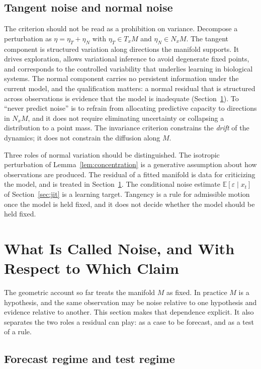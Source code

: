 \documentclass[11pt,a4paper]{article}
\theoremstyle{definition}
\theoremstyle{remark}
\newcommand{\TM}[1]{T_{#1}M}
\newcommand{\NM}[1]{N_{#1}M}
\begin{document}
\subsection{Tangent noise and normal noise}

The criterion should not be read as a prohibition on variance. Decompose a
perturbation as $\eta=\eta_T+\eta_N$ with $\eta_T\in\TM{x}$ and
$\eta_N\in\NM{x}$. The tangent component is structured variation along
directions the manifold supports. It drives exploration, allows
variational inference to avoid degenerate fixed points, and corresponds to
the controlled variability that underlies learning in biological systems.
The normal component carries no persistent information under the current model, and the qualification matters: a normal residual that is structured across observations is evidence that the model is inadequate (Section~\ref{sec:claim}). To
``never predict noise'' is to refrain from allocating predictive capacity
to directions in $\NM{x}$, and it does not require eliminating uncertainty
or collapsing a distribution to a point mass. The invariance criterion constrains the \emph{drift} of the dynamics; it does not constrain the diffusion along $M$.

Three roles of normal variation should be distinguished. The isotropic perturbation of Lemma~\ref{lem:concentration} is a generative assumption about how observations are produced. The residual of a fitted manifold is data for criticizing the model, and is treated in Section~\ref{sec:claim}. The conditional noise estimate $\mathbb{E}[\varepsilon\mid x_t]$ of Section~\ref{sec:jit} is a learning target. Tangency is a rule for admissible motion once the model is held fixed, and it does not decide whether the model should be held fixed.

\section{What Is Called Noise, and With Respect to Which Claim}\label{sec:claim}

The geometric account so far treats the manifold $M$ as fixed. In
practice $M$ is a hypothesis, and the same observation may be noise
relative to one hypothesis and evidence relative to another. This section
makes that dependence explicit. It also separates the two roles a
residual can play: as a case to be forecast, and as a test of a rule.

\subsection{Forecast regime and test regime}
\end{document}
